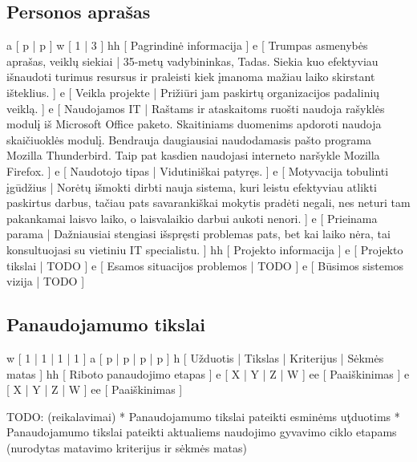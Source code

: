 \subsection{Personos aprašas}
\xtableu
{
  a [ p | p ]
  w [ 1 | 3 ]
  hh [ Pagrindinė informacija ]
  e [ Trumpas asmenybės aprašas, veiklų siekiai 
  | 
    35-metų vadybininkas, Tadas. Siekia kuo efektyviau išnaudoti turimus resursus ir praleisti
    kiek įmanoma mažiau laiko skirstant išteklius.
  ]
  e [ Veikla projekte 
  | 
    Prižiūri jam paskirtų organizacijos padalinių veiklą.
  ]
  e [ Naudojamos IT 
  | 
    Raštams ir ataskaitoms ruošti naudoja rašyklės modulį iš Microsoft Office paketo. Skaitiniams
    duomenims apdoroti naudoja skaičiuoklės modulį. Bendrauja daugiausiai naudodamasis pašto
    programa Mozilla Thunderbird. Taip pat kasdien naudojasi interneto naršykle Mozilla Firefox.
  ]
  e [ Naudotojo tipas 
  | 
    Vidutiniškai patyręs. 
  ]
  e [ Motyvacija tobulinti įgūdžius 
  |
    Norėtų išmokti dirbti nauja sistema, kuri leistu efektyviau atlikti paskirtus darbus, tačiau
    pats savarankiškai mokytis pradėti negali, nes neturi tam pakankamai laisvo laiko, o
    laisvalaikio darbui aukoti nenori.
  ]
  e [ Prieinama parama 
  | 
    Dažniausiai stengiasi išspręsti problemas pats, bet kai laiko nėra, tai konsultuojasi
    su vietiniu IT specialistu.
  ]
  hh [ Projekto informacija ]
  e [ Projekto tikslai 
  | 
    TODO 
  ]
  e [ Esamos situacijos problemos 
  | 
    TODO 
  ]
  e [ Būsimos sistemos vizija 
  | 
    TODO  
  ]
}

\subsection{Panaudojamumo tikslai}
\xtable
{
  w [ 1 | 1 | 1 | 1 ]
  a [ p | p | p | p ]
  h [ Užduotis | Tikslas | Kriterijus | Sėkmės matas ]
  hh [ Riboto panaudojimo etapas ]
  e [ X | Y | Z | W ]
  ee [ Paaiškinimas ]
  e [ X | Y | Z | W ]
  ee [ Paaiškinimas ]
}

TODO: (reikalavimai)
* Panaudojamumo tikslai pateikti esminėms uţduotims
* Panaudojamumo tikslai pateikti aktualiems naudojimo gyvavimo ciklo
etapams (nurodytas matavimo kriterijus ir sėkmės matas)
